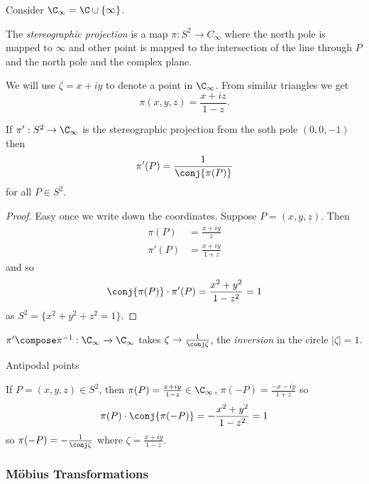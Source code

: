\documentclass[a4paper]{article}
\theoremstyle{definition}
\begin{document}
Consider \(\C_\infty = \C \cup \{\infty\}\).

\begin{definition}
  The \emph{stereographic projection} is a map \(\pi: S^2 \to C_\infty\) where the north pole is mapped to \(\infty\) and other point is mapped to the intersection of the line through \(P\) and the north pole and the complex plane.
\end{definition}

We will use \(\zeta = x + iy\) to denote a point in \(\C_\infty\). From similar triangles we get
\[
  \pi(x, y, z) = \frac{x + iz}{1 - z}.
\]

\begin{lemma}
  If \(\pi': S^2 \to \C_\infty\) is the stereographic projection from the soth pole \((0, 0, -1)\) then
  \[
    \pi'(P) = \frac{1}{\conj{\pi(P)}}
  \]
  for all \(P \in S^2\).
\end{lemma}

\begin{proof}
  Easy once we write down the coordinates. Suppose \(P = (x, y, z)\). Then
  \begin{align*}
    \pi(P) &= \frac{x + iy}{z} \\
    \pi'(P) &= \frac{x + iy}{1 + z}
  \end{align*}
  and so
  \[
    \conj{\pi(P)} \cdot \pi'(P) = \frac{x^2 + y^2}{1 - z^2} = 1
  \]
  as \(S^2 = \{x^2 + y^2 + z^2 = 1\}\).
\end{proof}

\begin{note}
  \(\pi' \compose \pi^{-1}: \C_\infty \to \C_\infty\) takes \(\zeta \to \frac{1}{\conj \zeta}\), the \emph{inversion} in the circle \(|\zeta| = 1\).
\end{note}

Antipodal points

If \(P = (x, y, z) \in S^2\), then \(\pi(P) = \frac{x + iy}{1 - z} \in \C_\infty\), \(\pi(-P) = \frac{-x - iy}{1 + z}\) so
\[
  \pi(P) \cdot \conj{\pi(-P)} = -\frac{x^2 + y^2}{1 - z^2} = 1
\]
so \(\pi(-P) = -\frac{1}{\conj \zeta}\) where \(\zeta = \frac{x + iy}{1 - z}\).

\subsubsection{Möbius Transformations}
\end{document}
